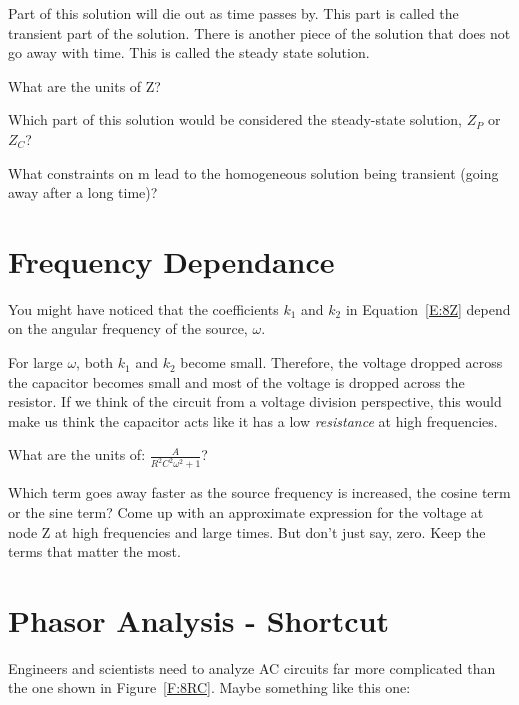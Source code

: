 Part of this solution will die out as time passes by. This part is called the transient part of the solution. There is another piece of the solution that does not go away with time. This is called the steady state solution.

\begin{alevel}
What are the units of Z?
\end{alevel} 

\begin{alevel}
Which part of this solution would be considered the steady-state solution, $Z_P$ or $Z_C$?
\end{alevel} 

\begin{dlevel}
What constraints on m lead to the homogeneous solution being transient (going away after a long time)?
\end{dlevel}

\section{Frequency Dependance}
You might have noticed that the coefficients $k_1$ and $k_2$ in Equation~\eqref{E:8Z} depend on the angular frequency of the source, $\omega$.\par

For large $\omega$, both $k_1$ and $k_2$ become small. Therefore, the voltage dropped across the capacitor becomes small and most of the voltage is dropped across the resistor. If we think of the circuit from a voltage division perspective, this would make us think the capacitor acts like it has a low \emph{resistance} at high frequencies.\par

\begin{alevel}
What are the units of: $\frac{A}{R^2C^2\omega^2+1}$?
\end{alevel}

\begin{clevel}
Which term goes away faster as the source frequency is increased, the cosine term or the sine term? Come up with an approximate expression for the voltage at node Z at high frequencies and large times. But don't just say, zero. Keep the terms that matter the most.
\end{clevel}


\section{Phasor Analysis - Shortcut}
Engineers and scientists need to analyze AC circuits far more complicated than the one shown in Figure~\ref{F:8RC}. Maybe something like this one:

